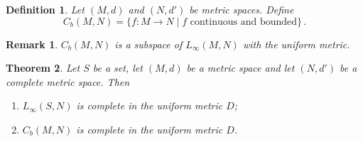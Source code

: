 \documentclass{article}
\theoremstyle{plain}\theoremheaderfont{\normalfont\itshape}\theorembodyfont{\rmfamily}\theoremseparator{.}\newtheorem*{rem}{Remark}\newtheorem*{ex}{Example}\newtheorem*{proof}{Proof}\newtheorem*{altp}{Alternative proof}
\theoremstyle{plain}\theoremheaderfont{\normalfont\bfseries}\theorembodyfont{\rmfamily}\theoremseparator{.}\newtheorem{thm}{Theorem}[section]\newtheorem{lem}[thm]{Lemma}\newtheorem{prop}[thm]{Proposition}\newtheorem*{cor}{Corollary}\newtheorem{defn}[thm]{Definition}\newtheorem{clm}[thm]{Claim}\newtheorem{clminproof}{Claim}
\theoremstyle{break}\theoremheaderfont{\normalfont\itshape}\theorembodyfont{\rmfamily}\theoremseparator{.\medskip}\newtheorem*{proofskip}{Proof}\newtheorem*{exs}{Examples}\newtheorem*{rems}{Remarks}
\theoremstyle{break}\theoremheaderfont{\normalfont\bfseries}\theorembodyfont{\rmfamily}\theoremseparator{.\medskip}\newtheorem{lemskip}[thm]{Lemma}\newtheorem{defnskip}[thm]{Definition}\newtheorem{propskip}[thm]{Proposition}\newtheorem{thmskip}[thm]{Theorem}
\begin{document}
    \begin{defn}
        Let \((M,d)\) and \((N,d')\) be metric spaces. Define
        \[C_b(M,N)=\{f:M\to N\mid f\text{ continuous and bounded}\}\,.\]
    \end{defn}
    \begin{rem}
        \(C_b(M,N)\) is a subspace of \(L_\infty(M,N)\) with the uniform metric.
    \end{rem}

    \begin{thm}
        Let \(S\) be a set, let \((M,d)\) be a metric space and let \((N,d')\) be a complete metric space. Then
        \begin{enumerate}[label=(\roman*),topsep=0pt]
            \item \(L_\infty(S,N)\) is complete in the uniform metric \(D\);
            \item \(C_b(M,N)\) is complete in the uniform metric \(D\).
        \end{enumerate}
    \end{thm}
\end{document}
